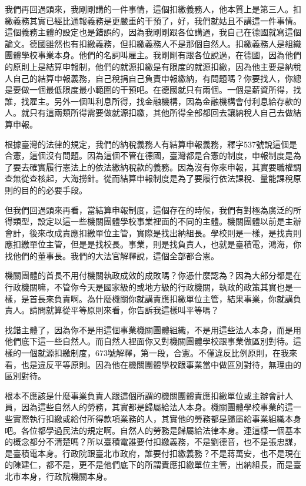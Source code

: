 \documentclass[]{ctexbook}
\begin{document}
我們再回過頭來，我剛剛講的一件事情，這個扣繳義務人，他本質上是第三人。扣繳義務其實已經比通報義務是更嚴重的干預了，好，我們就姑且不講這一件事情。這個義務主體的設定也是錯誤的，因為我剛剛跟各位講過，我自己在德國就寫這個論文。德國雖然也有扣繳義務，但扣繳義務人不是那個自然人。扣繳義務人是組織團體學校事業本身。他們的名詞叫雇主。我剛剛有跟各位說過，在德國，因為他們的原則上是結算申報制，他們的就源扣繳是有限度的就源扣繳，因為他主要是納稅人自己的結算申報義務，自己稅捐自己負責申報繳納，有問題嗎？你要找人，你總是要做一個最低限度最小範圍的干預吧。在德國就只有兩個。一個是薪資所得，找誰，找雇主。另外一個叫利息所得，找金融機構，因為金融機構會付利息給存款的人。就只有這兩類所得需要做就源扣繳，其他所得全部都回去讓納稅人自己去做結算申報。

根據臺灣的法律的規定，我們的納稅義務人有結算申報義務，釋字537號說這個是合憲，這個沒有問題。因為這個不管在德國，臺灣都是合憲的制度，申報制度是為了要去確實履行憲法上的依法繳納稅款的義務。因為沒有你來申報，其實要職權調查無從查核起，大海撈針。從而結算申報制度是為了要履行依法課稅、量能課稅原則的目的的必要手段。

但我們回過頭來再看，當結算申報制度，這個存在的時候，我們有對極為廣泛的所得類型，設定以這一些機關團體學校事業裡面的不同的主體。機關團體以前是主辦會計，後來改成責應扣繳單位主管，實際是找出納組長。學校則是一樣，是找責則應扣繳單位主管，但是是找校長。事業，則是找負責人，也就是臺積電，鴻海，你找他們的董事長。我們的大法官解釋說，這個全部都合憲。

機關團體的首長不用付機關執政成效的成敗嗎？你憑什麼認為？因為大部分都是在行政機關嘛，不管你今天是國家級的或地方級的行政機關，執政的政策其實也是一樣，是首長來負責啊。為什麼機關你就講責應扣繳單位主管，結果事業，你就講負責人。請問就算從平等原則來看，你告訴我這樣叫平等嗎？

找錯主體了，因為你不是用這個事業機關團體組織，不是用這些法人本身，而是用他們底下這一些自然人。而自然人裡面你又對機關團體學校跟事業做區別對待。這樣的一個就源扣繳制度，673號解釋，第一段，合憲。不僅違反比例原則，在我來看，也是違反平等原則。因為他在機關團體學校跟事業當中做區別對待，無理由的區別對待。

根本不應該是什麼事業負責人跟這個所謂的機關團體責應扣繳單位或主辦會計人員，因為這些自然人的勞務，其實都是歸屬給法人本身。機關團體學校事業的這一些實際執行扣繳或給付所得款項業務的人，其實他的勞務都是歸屬給事業組織本身吧。各位都學過民法的規定啊。自然人的勞務是歸屬給法律本身。連這樣一個基本的概念都分不清楚嗎？所以臺積電誰要付扣繳義務，不是劉德音，也不是張忠謀，是臺積電本身。行政院跟臺北市政府，誰要付扣繳義務？不是蔣萬安，也不是現在的陳建仁，都不是，更不是他們底下的所謂責應扣繳單位主管，出納組長，而是臺北市本身，行政院機關本身。
\end{document}
